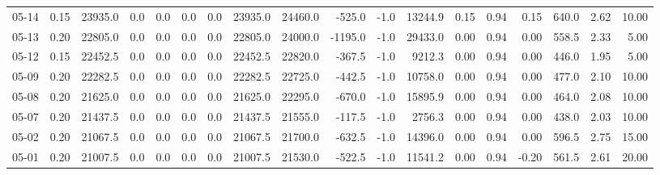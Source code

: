 \begin{threeparttable}
{\begin{tabular}{lrrrrrrrrrrrrrrrrr}
  05-14 &     0.15 & 23935.0 &               0.0 &               0.0 &                0.0 &                0.0 & 23935.0 & 24460.0 &     -525.0 &                     -1.0 &             13244.9 &       0.15 &      0.94 &           0.15 &            640.0 &            2.62 &                  10.00 \\
  05-13 &     0.20 & 22805.0 &               0.0 &               0.0 &                0.0 &                0.0 & 22805.0 & 24000.0 &    -1195.0 &                     -1.0 &             29433.0 &       0.00 &      0.94 &           0.00 &            558.5 &            2.33 &                   5.00 \\
  05-12 &     0.15 & 22452.5 &               0.0 &               0.0 &                0.0 &                0.0 & 22452.5 & 22820.0 &     -367.5 &                     -1.0 &              9212.3 &       0.00 &      0.94 &           0.00 &            446.0 &            1.95 &                   5.00 \\
  05-09 &     0.20 & 22282.5 &               0.0 &               0.0 &                0.0 &                0.0 & 22282.5 & 22725.0 &     -442.5 &                     -1.0 &             10758.0 &       0.00 &      0.94 &           0.00 &            477.0 &            2.10 &                  10.00 \\
  05-08 &     0.20 & 21625.0 &               0.0 &               0.0 &                0.0 &                0.0 & 21625.0 & 22295.0 &     -670.0 &                     -1.0 &             15895.9 &       0.00 &      0.94 &           0.00 &            464.0 &            2.08 &                  10.00 \\
  05-07 &     0.20 & 21437.5 &               0.0 &               0.0 &                0.0 &                0.0 & 21437.5 & 21555.0 &     -117.5 &                     -1.0 &              2756.3 &       0.00 &      0.94 &           0.00 &            438.0 &            2.03 &                  10.00 \\
  05-02 &     0.20 & 21067.5 &               0.0 &               0.0 &                0.0 &                0.0 & 21067.5 & 21700.0 &     -632.5 &                     -1.0 &             14396.0 &       0.00 &      0.94 &           0.00 &            596.5 &            2.75 &                  15.00 \\
  05-01 &     0.20 & 21007.5 &               0.0 &               0.0 &                0.0 &                0.0 & 21007.5 & 21530.0 &     -522.5 &                     -1.0 &             11541.2 &       0.00 &      0.94 &          -0.20 &            561.5 &            2.61 &                  20.00 \\

\end{tabular}}
\end{threeparttable}
